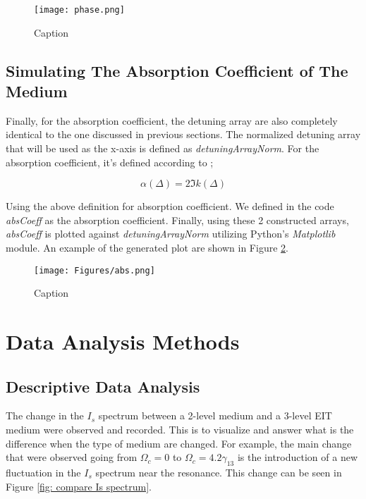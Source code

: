 \begin{figure}[h!]
    \centering
    \texttt{[image: phase.png]}
    \caption{Caption}
    \label{fig: phase}
\end{figure}

\subsection{Simulating The Absorption Coefficient of The Medium}
Finally, for the absorption coefficient, the detuning array are also completely identical to the one discussed in previous sections. The normalized detuning array that will be used as the x-axis is defined as \textit{detuningArrayNorm}. For the absorption coefficient, it's defined according to \cite{boyd2020nonlinear};

\begin{equation}
    \alpha(\Delta) = 2 \Im{k(\Delta)}
\end{equation}

Using the above definition for absorption coefficient. We defined in the code \textit{absCoeff} as the absorption coefficient. Finally, using these 2 constructed arrays, \textit{absCoeff} is plotted against \textit{detuningArrayNorm} utilizing Python's \textit{Matplotlib} module. An example of the generated plot are shown in Figure \ref{fig: abs}.

\begin{figure}[h!]
    \centering
    \texttt{[image: Figures/abs.png]}
    \caption{Caption}
    \label{fig: abs}
\end{figure}


\section{Data Analysis Methods}
\subsection{Descriptive Data Analysis}
The change in the $I_{s}$ spectrum between a 2-level medium and a 3-level EIT medium were observed and recorded. This is to visualize and answer what is the difference when the type of medium are changed. For example, the main change that were observed going from $\Omega_{c} = 0$ to $\Omega_{c} = 4.2\gamma_{13}$ is the introduction of a new fluctuation in the $I_{s}$ spectrum near the resonance. This change can be seen in Figure \ref{fig: compare Is spectrum}. 

